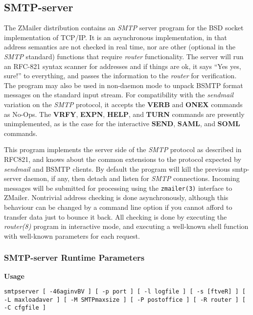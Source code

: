 \subsection{SMTP-server}

The ZMailer distribution contains an {\em SMTP\/} server program for the BSD socket
implementation of TCP/IP.  It is an asynchronous implementation, in that
address semantics are not checked in real time, nor are other (optional in
the {\em SMTP\/} standard) functions that require {\em router\/} functionality. The server
will run an RFC-821 syntax scanner for addresses and if things are ok, it 
says ``Yes yes, sure!'' to everything, and passes the information to
the {\em router\/} for verification.  The program may also be used in non-daemon
mode to unpack BSMTP format messages on the standard input stream.  For
compatibility with the {\em sendmail\/} variation on the {\em SMTP\/} protocol, it accepts
the {\bf VERB} and {\bf ONEX} commands as No-Ops. The {\bf VRFY}, 
{\bf EXPN}, {\bf HELP}, and
{\bf TURN} commands are presently unimplemented, as is the case for the
interactive {\bf SEND}, {\bf SAML}, and {\bf SOML} commands.

This program implements the server side of the {\em SMTP\/} protocol as described in 
RFC821, and knows about the common extensions to the protocol expected by
{\em sendmail\/} and BSMTP clients. By default the program will kill the previous 
smtp-server daemon, if any, then detach and listen for {\em SMTP\/} connections. 
Incoming messages will be submitted for processing using the 
{\tt zmailer(3)} interface to ZMailer. Nontrivial address checking is 
done asynchronously, although this behaviour can be changed by a command 
line option if you cannot afford to transfer data just to bounce it back. 
All checking is done by executing the {\em router(8)\/} program in 
interactive mode, and executing a well-known shell function with well-known 
parameters for each request.




\subsubsection{SMTP-server Runtime Parameters}



{\bf Usage}

{\tt smtpserver [ -46aginvBV ] [ -p port ] [ -l logfile ] [ -s [ftveR] ] [ -L maxloadaver ] [ -M SMTPmaxsize ] [ -P postoffice ] [ -R router ] [ -C cfgfile ]}

